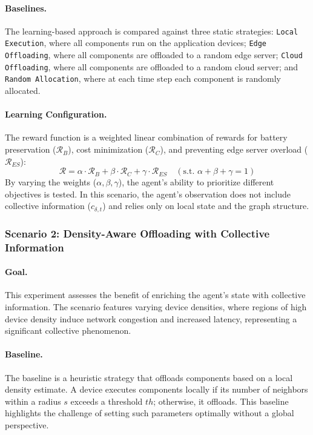 \paragraph{Baselines.} 
The learning-based approach is compared against three static strategies:
 \texttt{Local Execution}, where all components run on the application devices;
 \texttt{Edge Offloading}, where all components are offloaded to a random edge server;
 \texttt{Cloud Offloading}, where all components are offloaded to a random cloud server; and
 \texttt{Random Allocation}, where at each time step each component is randomly allocated.
 
\paragraph{Learning Configuration.} The reward function is a weighted linear combination of rewards for battery preservation ($\mathcal{R}_{B}$), 
cost minimization ($\mathcal{R}_{C}$), 
and preventing edge server overload ($\mathcal{R}_{ES}$):
\[ \mathcal{R} = \alpha \cdot \mathcal{R}_{B} + \beta \cdot \mathcal{R}_{C} + \gamma \cdot \mathcal{R}_{ES} \quad (\text{s.t. } \alpha + \beta + \gamma = 1) \]
By varying the weights ($\alpha, \beta, \gamma$), 
the agent's ability to prioritize different objectives is tested. In this scenario, 
the agent's observation does not include collective information ($c_{\delta,t}$) 
and relies only on local state and the graph structure.

\subsubsection{Scenario 2: Density-Aware Offloading with Collective Information}
\paragraph{Goal.} 
This experiment assesses the benefit of enriching the agent's state with collective information. 
The scenario features varying device densities, 
where regions of high device density induce network congestion and increased latency, 
representing a significant collective phenomenon.

\paragraph{Baseline.} 
The baseline is a heuristic strategy that offloads components based on a local density estimate. 
A device executes components locally if its number of neighbors within a radius $s$ exceeds a threshold $th$; 
otherwise, it offloads. 
This baseline highlights the challenge of setting such parameters optimally without a global perspective.

